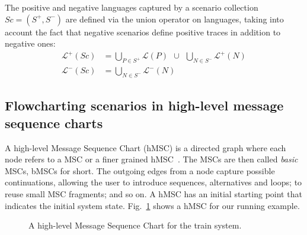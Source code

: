 The positive and negative languages captured by a scenario collection $Sc = (S^+,S^-)$ are defined via the union operator on languages, taking into account the fact that negative scenarios define positive traces in addition to negative ones:
\begin{align}
\mathcal{L}^+(Sc) &= \bigcup_{P \in S^+} \mathcal{L}(P)~~\cup~~\bigcup_{N \in S^{-}} \mathcal{L}^{+}(N) \\
\mathcal{L}^-(Sc) &= \bigcup_{N \in S^-} \mathcal{L}^{-}(N)
\end{align}

\subsection{Flowcharting scenarios in high-level message sequence charts\label{subsection:background-hmsc}}

A high-level Message Sequence Chart (hMSC) is a directed graph where each node refers to a MSC or a finer grained hMSC~\cite{ITU:1996}. The MSCs are then called \emph{basic} MSCs, bMSCs for short. The outgoing edges from a node capture possible continuations, allowing the user to introduce sequences, alternatives and loops; to reuse small MSC fragments; and so on. A hMSC has an initial starting point that indicates the initial system state. Fig.~\ref{image:train-hmsc} shows a hMSC for our running example.

\vspace{0.4cm}
\begin{figure}[H]\centering
{}
\caption{A high-level Message Sequence Chart for the train system.\label{image:train-hmsc}}
\end{figure}

